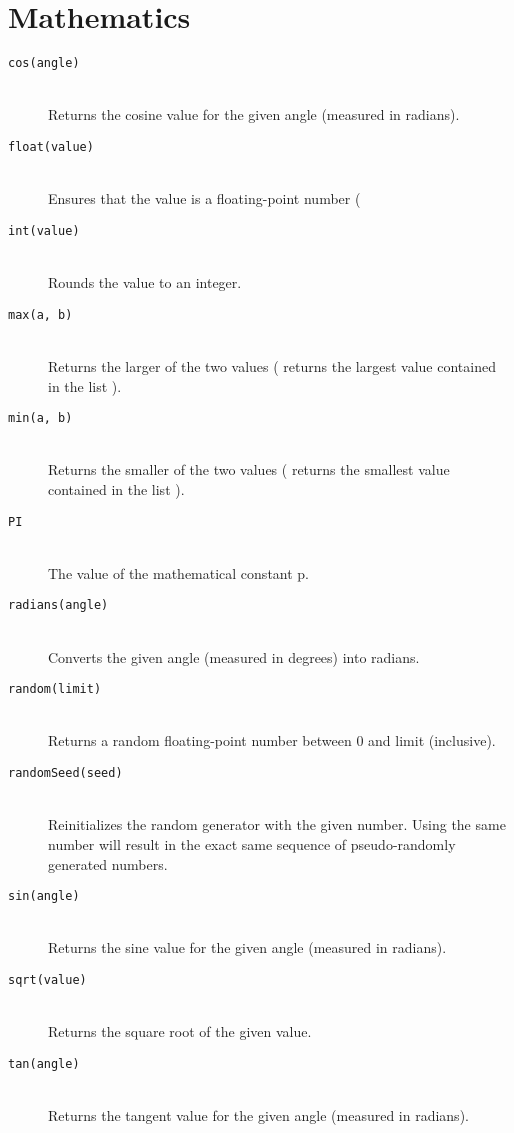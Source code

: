 \section{Mathematics}
\begin{description}
\item[\texttt{cos(angle)}] \hfill \\
	Returns the cosine value for the given angle (measured in radians).
\item[\texttt{float(value)}] \hfill \\
	Ensures that the value is a floating-point number (
\item[\texttt{int(value)}] \hfill \\
	Rounds the value to an integer.
\item[\texttt{max(a, b)}] \hfill \\
	Returns the larger of the two values ( returns the largest value contained in the list ).
\item[\texttt{min(a, b)}] \hfill \\
	Returns the smaller of the two values ( returns the smallest value contained in the list ).
\item[\texttt{PI}] \hfill \\
	The value of the mathematical constant p.
\item[\texttt{radians(angle)}] \hfill \\
	Converts the given angle (measured in degrees) into radians.
\item[\texttt{random(limit)}] \hfill \\
	Returns a random floating-point number between 0 and limit (inclusive).
\item[\texttt{randomSeed(seed)}] \hfill \\
	Reinitializes the random generator with the given  number. Using the same number will result in the exact same sequence of pseudo-randomly generated numbers.
\item[\texttt{sin(angle)}] \hfill \\
	Returns the sine value for the given angle (measured in radians).
\item[\texttt{sqrt(value)}] \hfill \\
	Returns the square root of the given value.
\item[\texttt{tan(angle)}] \hfill \\
	Returns the tangent value for the given angle (measured in radians).
\end{description}

